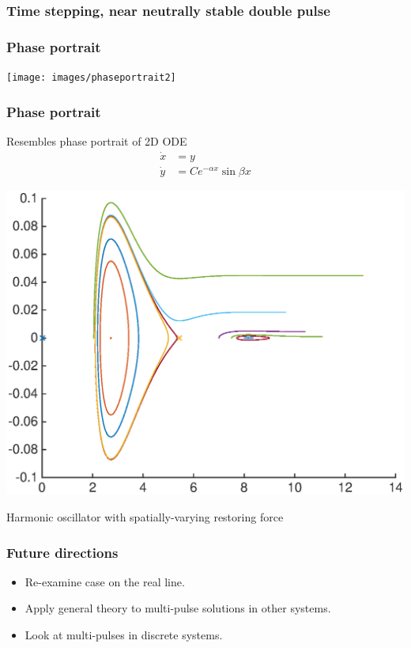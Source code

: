 \documentclass[16pt]{beamer}
\begin{document}
\begin{frame}
	\frametitle{Time stepping, near neutrally stable double pulse}
	\fontsize{16}{7.2}\selectfont
	\begin{center}
	\end{center}
\end{frame}

\begin{frame}
	\frametitle{Phase portrait}
	\fontsize{16}{7.2}\selectfont
	\begin{center}
	\texttt{[image: images/phaseportrait2]}
	\end{center}
\end{frame}

\begin{frame}
	\frametitle{Phase portrait}
	\fontsize{16}{7.2}\selectfont
	Resembles phase portrait of 2D ODE
	\begin{align*}
	\dot{x} &= y \\
	\dot{y} &= C e^{-\alpha x} \sin \beta x
	\end{align*}
	\begin{center}
	\includegraphics[width=0.5\linewidth]{images/simplephaseportrait}
	\end{center}
	Harmonic oscillator with spatially-varying restoring force
\end{frame}

\begin{frame}
	\frametitle{Future directions}
	\fontsize{16}{7.2}\selectfont
	\begin{itemize}
		\item Re-examine case on the real line.
		\vspace{0.5cm}
		\item Apply general theory to multi-pulse solutions in other systems.
		\vspace{0.5cm}
		\item Look at multi-pulses in discrete systems.
	\end{itemize}
\end{frame}
\end{document}
